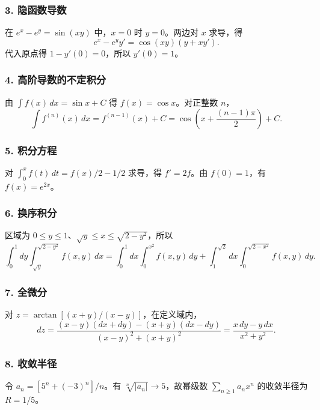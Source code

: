 \documentclass[11pt,fontset=fandol]{ctexart}
\begin{document}
\subsubsection{3. 隐函数导数}\label{ux9690ux51fdux6570ux5bfcux6570}

在 \(e^x-e^y=\sin(xy)\) 中，\(x=0\) 时 \(y=0\)。两边对 \(x\) 求导，得 \[
e^x-e^yy'=\cos(xy)(y+xy').
\] 代入原点得 \(1-y'(0)=0\)，所以 \(\boxed{y'(0)=1}\)。

\subsubsection{4.
高阶导数的不定积分}\label{ux9ad8ux9636ux5bfcux6570ux7684ux4e0dux5b9aux79efux5206}

由 \(\int f(x)\,dx=\sin x+C\) 得 \(f(x)=\cos x\)。对正整数 \(n\)， \[
\boxed{\int f^{(n)}(x)\,dx=f^{(n-1)}(x)+C=\cos\left(x+\frac{(n-1)\pi}{2}\right)+C.}
\]

\subsubsection{5. 积分方程}\label{ux79efux5206ux65b9ux7a0b}

对 \(\int_0^xf(t)\,dt=f(x)/2-1/2\) 求导，得 \(f'=2f\)。由 \(f(0)=1\)，有
\(\boxed{f(x)=e^{2x}}\)。

\subsubsection{6. 换序积分}\label{ux6362ux5e8fux79efux5206}

区域为 \(0\leq y\leq1\)、\(\sqrt y\leq x\leq\sqrt{2-y^2}\)，所以 \[
\boxed{\int_0^1dy\int_{\sqrt y}^{\sqrt{2-y^2}}f(x,y)\,dx
=\int_0^1dx\int_0^{x^2}f(x,y)\,dy
+\int_1^{\sqrt2}dx\int_0^{\sqrt{2-x^2}}f(x,y)\,dy.}
\]

\subsubsection{7. 全微分}\label{ux5168ux5faeux5206}

对 \(z=\arctan[(x+y)/(x-y)]\)，在定义域内， \[
dz=\frac{(x-y)(dx+dy)-(x+y)(dx-dy)}{(x-y)^2+(x+y)^2}=\boxed{\frac{x\,dy-y\,dx}{x^2+y^2}}.
\]

\subsubsection{8. 收敛半径}\label{ux6536ux655bux534aux5f84}

令 \(a_n=[5^n+(-3)^n]/n\)。有 \(\sqrt[n]{|a_n|}\to5\)，故幂级数
\(\sum_{n\geq1}a_nx^n\) 的收敛半径为 \(\boxed{R=1/5}\)。
\end{document}
